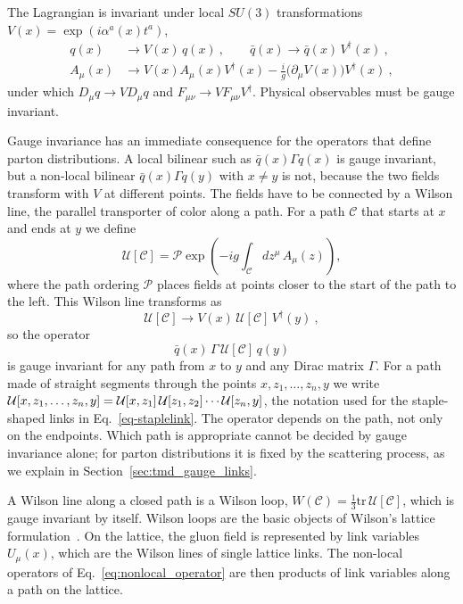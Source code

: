 The Lagrangian is invariant under local $SU(3)$ transformations $V(x) = \exp\left(i\alpha^a(x)t^a\right)$,
\begin{align}
  q(x) &\to V(x)\,q(x)\ , \qquad \bar{q}(x) \to \bar{q}(x)\,V^\dagger(x)\ , \nonumber\\
  A_\mu(x) &\to V(x)A_\mu(x)V^\dagger(x) - \frac{i}{g}\big(\partial_\mu V(x)\big)V^\dagger(x) \ ,
  \label{eq:gauge_transformation}
\end{align}
under which $D_\mu q \to V D_\mu q$ and $F_{\mu\nu} \to V F_{\mu\nu} V^\dagger$. Physical observables must be gauge invariant.

Gauge invariance has an immediate consequence for the operators that define parton distributions. A local bilinear such as $\bar{q}(x)\Gamma q(x)$ is gauge invariant, but a non-local bilinear $\bar{q}(x)\Gamma q(y)$ with $x\neq y$ is not, because the two fields transform with $V$ at different points. The fields have to be connected by a Wilson line, the parallel transporter of color along a path. For a path $\mathcal{C}$ that starts at $x$ and ends at $y$ we define
\begin{equation}
  \mathcal{U}[\mathcal{C}] = \mathcal{P}\exp\left(-i g \int_{\mathcal{C}} dz^\mu\, A_\mu(z)\right) ,
  \label{eq:wilson_line}
\end{equation}
where the path ordering $\mathcal{P}$ places fields at points closer to the start of the path to the left. This Wilson line transforms as
\begin{equation}
  \mathcal{U}[\mathcal{C}] \to V(x)\,\mathcal{U}[\mathcal{C}]\,V^\dagger(y) \ ,
\end{equation}
so the operator
\begin{equation}
  \bar{q}(x)\,\Gamma\,\mathcal{U}[\mathcal{C}]\,q(y)
  \label{eq:nonlocal_operator}
\end{equation}
is gauge invariant for any path from $x$ to $y$ and any Dirac matrix $\Gamma$. For a path made of straight segments through the points $x, z_1, \ldots, z_n, y$ we write ${\mathcal{U}}[x,z_1,\ldots,z_n,y] = {\mathcal{U}}[x,z_1]\,{\mathcal{U}}[z_1,z_2]\cdots{\mathcal{U}}[z_n,y]$, the notation used for the staple-shaped links in Eq.~\eqref{eq-staplelink}. The operator depends on the path, not only on the endpoints. Which path is appropriate cannot be decided by gauge invariance alone; for parton distributions it is fixed by the scattering process, as we explain in Section~\ref{sec:tmd_gauge_links}.

A Wilson line along a closed path is a Wilson loop, $W(\mathcal{C}) = \frac{1}{3}\mathrm{tr}\,\mathcal{U}[\mathcal{C}]$, which is gauge invariant by itself. Wilson loops are the basic objects of Wilson's lattice formulation~\cite{Wilson:1974sk}. On the lattice, the gluon field is represented by link variables $U_\mu(x)$, which are the Wilson lines of single lattice links. The non-local operators of Eq.~\eqref{eq:nonlocal_operator} are then products of link variables along a path on the lattice.

